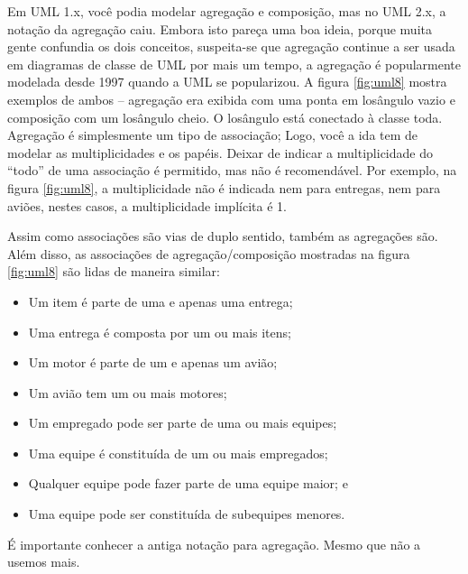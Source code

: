 \documentclass[
	11pt,				%
	openright,
	twoside,			%
	a4paper,			%
	english,			%
	french,
	brazil,				%
	sumario=tradicional
	]{abntex2}
\begin{document}
Em UML 1.x, você podia modelar agregação e composição, mas no UML 2.x, a notação da agregação caiu. Embora isto pareça uma boa ideia, porque muita gente confundia os dois conceitos, suspeita-se que agregação continue a ser usada em diagramas de classe de UML por mais um tempo, a agregação é popularmente modelada desde 1997 quando a UML se popularizou. A figura \ref{fig:uml8} mostra exemplos de ambos -- agregação era exibida com uma ponta em losângulo vazio e composição com um losângulo cheio. O losângulo está conectado à classe toda. Agregação é simplesmente um tipo de associação; Logo, você a ida tem de modelar as multiplicidades e os papéis. Deixar de indicar a multiplicidade do ``todo'' de uma associação é permitido, mas não é recomendável. Por exemplo, na figura \ref{fig:uml8}, a multiplicidade não é indicada nem para entregas, nem para aviões, nestes casos, a multiplicidade implícita é 1.

Assim como associações são vias de duplo sentido, também as agregações são. Além disso, as associações de agregação/composição mostradas na figura \ref{fig:uml8} são lidas de maneira similar:
\begin{itemize}
\item Um item é parte de uma e apenas uma entrega;
\item Uma entrega é composta por um ou mais itens;
\item Um motor é parte de um e apenas um avião;
\item Um avião tem um ou mais motores;
\item Um empregado pode ser parte de uma ou mais equipes;
\item Uma equipe é constituída de um ou mais empregados;
\item Qualquer equipe pode fazer parte de uma equipe maior; e
\item Uma equipe pode ser constituída de subequipes menores.
\end{itemize}

É importante conhecer a antiga notação para agregação. Mesmo que não a usemos mais.
\end{document}
